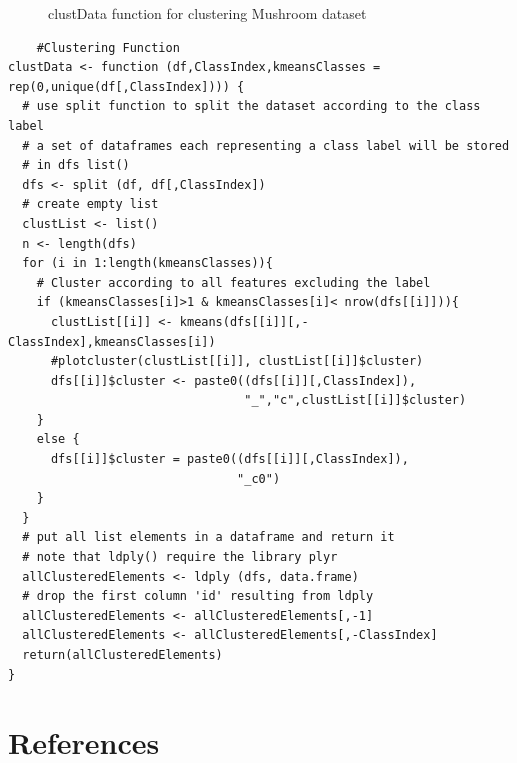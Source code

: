 \documentclass[10pt  ,usenames, dvipsnames]{article}\usepackage[]{graphicx}\usepackage[]{color}
\begin{document}
\clearpage

\begin{figure}[H]
\caption {clustData function for clustering Mushroom dataset}
\end {figure}
    \begin{lstlisting}
    #Clustering Function
clustData <- function (df,ClassIndex,kmeansClasses = rep(0,unique(df[,ClassIndex]))) {
  # use split function to split the dataset according to the class label
  # a set of dataframes each representing a class label will be stored
  # in dfs list()
  dfs <- split (df, df[,ClassIndex])
  # create empty list
  clustList <- list()
  n <- length(dfs)
  for (i in 1:length(kmeansClasses)){
    # Cluster according to all features excluding the label
    if (kmeansClasses[i]>1 & kmeansClasses[i]< nrow(dfs[[i]])){
      clustList[[i]] <- kmeans(dfs[[i]][,-ClassIndex],kmeansClasses[i])
      #plotcluster(clustList[[i]], clustList[[i]]$cluster)
      dfs[[i]]$cluster <- paste0((dfs[[i]][,ClassIndex]),
                                 "_","c",clustList[[i]]$cluster)
    }
    else {
      dfs[[i]]$cluster = paste0((dfs[[i]][,ClassIndex]),
                                "_c0")
    }
  }
  # put all list elements in a dataframe and return it
  # note that ldply() require the library plyr
  allClusteredElements <- ldply (dfs, data.frame)
  # drop the first column 'id' resulting from ldply
  allClusteredElements <- allClusteredElements[,-1]
  allClusteredElements <- allClusteredElements[,-ClassIndex]
  return(allClusteredElements)
}
\end{lstlisting}
\label{figCluster}


\clearpage

\section{References}\label{pubs}

\printbibliography[heading =none]


\clearpage
\end{document}
